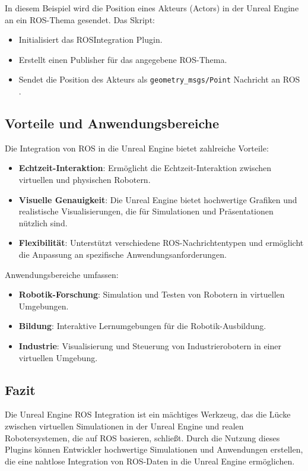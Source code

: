 In diesem Beispiel wird die Position eines Akteurs (Actors) in der Unreal Engine an ein ROS-Thema gesendet. Das Skript:

\begin{itemize}
    \item Initialisiert das ROSIntegration Plugin.
    \item Erstellt einen Publisher für das angegebene ROS-Thema.
    \item Sendet die Position des Akteurs als \texttt{geometry\_msgs/Point} Nachricht an ROS \cite{ros_integration_github}.
\end{itemize}

\subsection{Vorteile und Anwendungsbereiche}

Die Integration von ROS in die Unreal Engine bietet zahlreiche Vorteile:

\begin{itemize}
    \item \textbf{Echtzeit-Interaktion}: Ermöglicht die Echtzeit-Interaktion zwischen virtuellen und physischen Robotern.
    \item \textbf{Visuelle Genauigkeit}: Die Unreal Engine bietet hochwertige Grafiken und realistische Visualisierungen, die für Simulationen und Präsentationen nützlich sind.
    \item \textbf{Flexibilität}: Unterstützt verschiedene ROS-Nachrichtentypen und ermöglicht die Anpassung an spezifische Anwendungsanforderungen.
\end{itemize}

Anwendungsbereiche umfassen:

\begin{itemize}
    \item \textbf{Robotik-Forschung}: Simulation und Testen von Robotern in virtuellen Umgebungen.
    \item \textbf{Bildung}: Interaktive Lernumgebungen für die Robotik-Ausbildung.
    \item \textbf{Industrie}: Visualisierung und Steuerung von Industrierobotern in einer virtuellen Umgebung.
\end{itemize}

\subsection{Fazit}

Die Unreal Engine ROS Integration ist ein mächtiges Werkzeug, das die Lücke zwischen virtuellen Simulationen in der Unreal Engine und realen Robotersystemen, die auf ROS basieren, schließt. Durch die Nutzung dieses Plugins können Entwickler hochwertige Simulationen und Anwendungen erstellen, die eine nahtlose Integration von ROS-Daten in die Unreal Engine ermöglichen.
